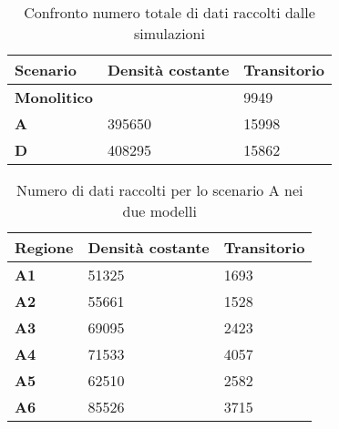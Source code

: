 \documentclass[a4paper, 12pt]{article}
\author{Aurel Pjetri}
\date{}
\begin{document}
\begin{table}[h]
  \centering
  \resizebox{0.7\textwidth}{!} {
  \begin{tabular}{ |l|l|l| }
	\hline
	\textbf{Scenario}	&		\textbf{Densità costante}	&		\textbf{Transitorio}	\\ \hline
	\textbf{Monolitico} &		 						&		9949		\\ \hline
	\textbf{A}			 &		395650 				&		15998		\\ \hline
	\textbf{D}			 &		408295 				&		15862		\\ \hline

  \end{tabular}
  }
  \caption{Confronto numero totale di dati raccolti dalle simulazioni}
  \label{tab:tabella-confronto}
\end{table}

\begin{table}[h]
  \centering
  \resizebox{0.7\textwidth}{!} {
  \begin{tabular}[t]{ |l|l|l| }
	\hline
	\textbf{Regione}	 &		\textbf{Densità costante}	&		\textbf{Transitorio}	\\ \hline
	\textbf{A1} 		 &		51325				&		1693		\\ \hline
	\textbf{A2}			 &		55661 				&		1528		\\ \hline
	\textbf{A3}			 &		69095 				&		2423		\\ \hline
	\textbf{A4}			 &		71533 				&		4057		\\ \hline
	\textbf{A5}			 &		62510 				&		2582		\\ \hline
	\textbf{A6}			 &		85526 				&		3715		\\ \hline

  \end{tabular}
  
  }
  \caption{Numero di dati raccolti per lo scenario A nei due modelli}
  \label{tab:tabella-dati-simulazioni-A}
\end{table}
\end{document}
